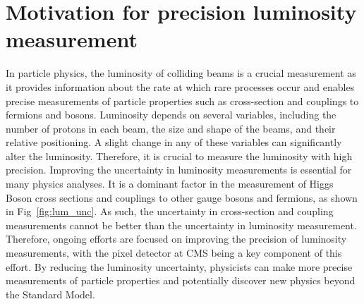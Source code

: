 \section{Motivation for precision luminosity measurement}


In particle physics, the luminosity of colliding beams is a crucial measurement as it provides information about the rate at which rare processes occur and enables precise measurements of particle properties such as cross-section and couplings to fermions and bosons. Luminosity depends on several variables, including the number of protons in each beam, the size and shape of the beams, and their relative positioning. A slight change in any of these variables can significantly alter the luminosity.
Therefore, it is crucial to measure the luminosity with high precision.
Improving the uncertainty in luminosity measurements is essential for many physics analyses.
It is a dominant factor in the measurement of Higgs Boson cross sections and couplings to other gauge bosons and fermions, as shown in Fig~\ref{fig:lum_unc}. As such, the uncertainty in cross-section and coupling measurements cannot be better than the uncertainty in luminosity measurement. Therefore, ongoing efforts are focused on improving the precision of luminosity measurements, with the pixel detector at CMS being a key component of this effort. By reducing the luminosity uncertainty, physicists can make more precise measurements of particle properties and potentially discover new physics beyond the Standard Model.

